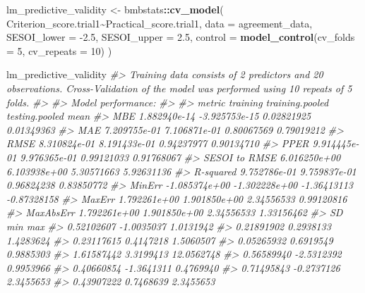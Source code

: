 \documentclass[
]{book}
\newenvironment{Shaded}{\begin{snugshade}}{\end{snugshade}}
\newcommand{\CommentTok}[1]{\textcolor[rgb]{0.56,0.35,0.01}{\textit{#1}}}
\newcommand{\DataTypeTok}[1]{\textcolor[rgb]{0.13,0.29,0.53}{#1}}
\newcommand{\DecValTok}[1]{\textcolor[rgb]{0.00,0.00,0.81}{#1}}
\newcommand{\FloatTok}[1]{\textcolor[rgb]{0.00,0.00,0.81}{#1}}
\newcommand{\KeywordTok}[1]{\textcolor[rgb]{0.13,0.29,0.53}{\textbf{#1}}}
\newcommand{\NormalTok}[1]{#1}
\newcommand{\OperatorTok}[1]{\textcolor[rgb]{0.81,0.36,0.00}{\textbf{#1}}}
\newcommand{\StringTok}[1]{\textcolor[rgb]{0.31,0.60,0.02}{#1}}
\begin{document}
\begin{Shaded}
\begin{Highlighting}[]
\NormalTok{lm\_predictive\_validity <{-}}\StringTok{ }\NormalTok{bmbstats}\OperatorTok{::}\KeywordTok{cv\_model}\NormalTok{(}
\NormalTok{  Criterion\_score.trial1}\OperatorTok{\textasciitilde{}}\NormalTok{Practical\_score.trial1,}
  \DataTypeTok{data =}\NormalTok{ agreement\_data,}
  \DataTypeTok{SESOI\_lower =} \FloatTok{{-}2.5}\NormalTok{,}
  \DataTypeTok{SESOI\_upper =} \FloatTok{2.5}\NormalTok{,}
  \DataTypeTok{control =} \KeywordTok{model\_control}\NormalTok{(}\DataTypeTok{cv\_folds =} \DecValTok{5}\NormalTok{, }\DataTypeTok{cv\_repeats =} \DecValTok{10}\NormalTok{)}
\NormalTok{)}

\NormalTok{lm\_predictive\_validity}
\CommentTok{\#> Training data consists of 2 predictors and 20 observations. Cross{-}Validation of the model was performed using 10 repeats of 5 folds.}
\CommentTok{\#> }
\CommentTok{\#> Model performance:}
\CommentTok{\#> }
\CommentTok{\#>         metric      training training.pooled testing.pooled        mean}
\CommentTok{\#>            MBE  1.882940e{-}14   {-}3.925753e{-}15     0.02821925  0.01349363}
\CommentTok{\#>            MAE  7.209755e{-}01    7.106871e{-}01     0.80067569  0.79019212}
\CommentTok{\#>           RMSE  8.310824e{-}01    8.191433e{-}01     0.94237977  0.90134710}
\CommentTok{\#>           PPER  9.914445e{-}01    9.976365e{-}01     0.99121033  0.91768067}
\CommentTok{\#>  SESOI to RMSE  6.016250e+00    6.103938e+00     5.30571663  5.92631136}
\CommentTok{\#>      R{-}squared  9.752786e{-}01    9.759837e{-}01     0.96824238  0.83850772}
\CommentTok{\#>         MinErr {-}1.085374e+00   {-}1.302228e+00    {-}1.36413113 {-}0.87328158}
\CommentTok{\#>         MaxErr  1.792261e+00    1.901850e+00     2.34556533  0.99120816}
\CommentTok{\#>      MaxAbsErr  1.792261e+00    1.901850e+00     2.34556533  1.33156462}
\CommentTok{\#>          SD        min        max}
\CommentTok{\#>  0.52102607 {-}1.0035037  1.0131942}
\CommentTok{\#>  0.21891902  0.2938133  1.4283624}
\CommentTok{\#>  0.23117615  0.4147218  1.5060507}
\CommentTok{\#>  0.05265932  0.6919549  0.9885303}
\CommentTok{\#>  1.61587442  3.3199413 12.0562748}
\CommentTok{\#>  0.56589940 {-}2.5312392  0.9953966}
\CommentTok{\#>  0.40660854 {-}1.3641311  0.4769940}
\CommentTok{\#>  0.71495843 {-}0.2737126  2.3455653}
\CommentTok{\#>  0.43907222  0.7468639  2.3455653}
\end{Highlighting}
\end{Shaded}
\end{document}
